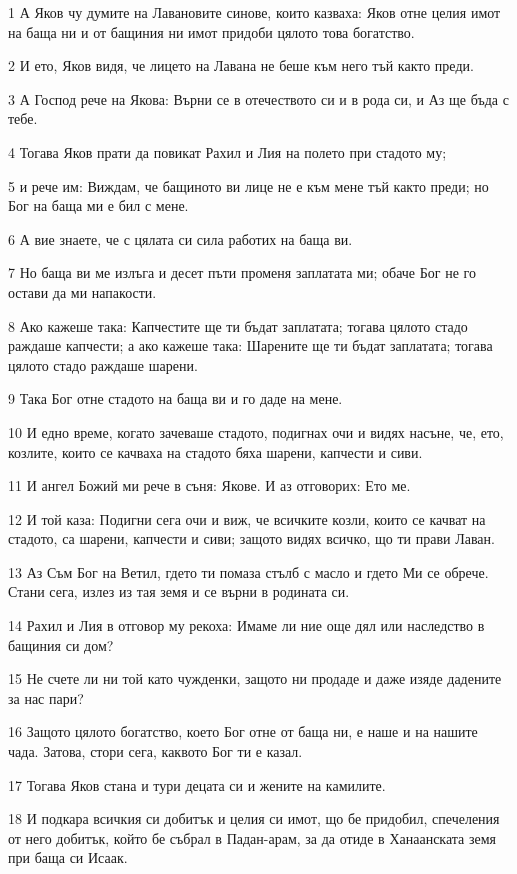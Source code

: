 \par 1 А Яков чу думите на Лавановите синове, които казваха: Яков отне целия имот на баща ни и от бащиния ни имот придоби цялото това богатство.
\par 2 И ето, Яков видя, че лицето на Лавана не беше към него тъй както преди.
\par 3 А Господ рече на Якова: Върни се в отечеството си и в рода си, и Аз ще бъда с тебе.
\par 4 Тогава Яков прати да повикат Рахил и Лия на полето при стадото му;
\par 5 и рече им: Виждам, че бащиното ви лице не е към мене тъй както преди; но Бог на баща ми е бил с мене.
\par 6 А вие знаете, че с цялата си сила работих на баща ви.
\par 7 Но баща ви ме излъга и десет пъти променя заплатата ми; обаче Бог не го остави да ми напакости.
\par 8 Ако кажеше така: Капчестите ще ти бъдат заплатата; тогава цялото стадо раждаше капчести; а ако кажеше така: Шарените ще ти бъдат заплатата; тогава цялото стадо раждаше шарени.
\par 9 Така Бог отне стадото на баща ви и го даде на мене.
\par 10 И едно време, когато зачеваше стадото, подигнах очи и видях насъне, че, ето, козлите, които се качваха на стадото бяха шарени, капчести и сиви.
\par 11 И ангел Божий ми рече в съня: Якове. И аз отговорих: Ето ме.
\par 12 И той каза: Подигни сега очи и виж, че всичките козли, които се качват на стадото, са шарени, капчести и сиви; защото видях всичко, що ти прави Лаван.
\par 13 Аз Съм Бог на Ветил, гдето ти помаза стълб с масло и гдето Ми се обрече. Стани сега, излез из тая земя и се върни в родината си.
\par 14 Рахил и Лия в отговор му рекоха: Имаме ли ние още дял или наследство в бащиния си дом?
\par 15 Не счете ли ни той като чужденки, защото ни продаде и даже изяде дадените за нас пари?
\par 16 Защото цялото богатство, което Бог отне от баща ни, е наше и на нашите чада. Затова, стори сега, каквото Бог ти е казал.
\par 17 Тогава Яков стана и тури децата си и жените на камилите.
\par 18 И подкара всичкия си добитък и целия си имот, що бе придобил, спечеления от него добитък, който бе събрал в Падан-арам, за да отиде в Ханаанската земя при баща си Исаак.
